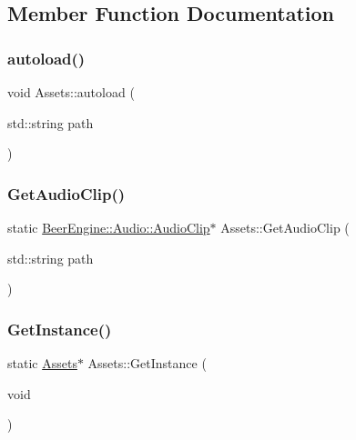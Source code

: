 \subsection{Member Function Documentation}
\mbox{\label{class_assets_a4e848364b8e24434ec5be20c28106dbd}} 
\subsubsection{\texorpdfstring{autoload()}{autoload()}}
{\footnotesize\ttfamily void Assets\+::autoload (\begin{DoxyParamCaption}\item[{std\+::string}]{path }\end{DoxyParamCaption})}

\mbox{\label{class_assets_a8f344169002807c95cb543d1116ea2bb}} 
\subsubsection{\texorpdfstring{Get\+Audio\+Clip()}{GetAudioClip()}}
{\footnotesize\ttfamily static \mbox{\hyperlink{class_beer_engine_1_1_audio_1_1_audio_clip}{Beer\+Engine\+::\+Audio\+::\+Audio\+Clip}}$\ast$ Assets\+::\+Get\+Audio\+Clip (\begin{DoxyParamCaption}\item[{std\+::string}]{path }\end{DoxyParamCaption})\hspace{0.3cm}{\ttfamily [static]}}

\mbox{\label{class_assets_a1ec0f88affb09ed018d3f8026f64c15b}} 
\subsubsection{\texorpdfstring{Get\+Instance()}{GetInstance()}}
{\footnotesize\ttfamily static \mbox{\hyperlink{class_assets}{Assets}}$\ast$ Assets\+::\+Get\+Instance (\begin{DoxyParamCaption}\item[{void}]{ }\end{DoxyParamCaption})\hspace{0.3cm}{\ttfamily [static]}}

